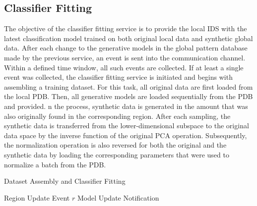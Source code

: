 \documentclass[../../main.tex]{subfiles}
\begin{document}
\subsection{Classifier Fitting} \label{sec:classifier_fitting}

The objective of the classifier fitting service is to provide the local IDS with the latest classification model trained on both original local data and synthetic global data. After each change to the generative models in the global pattern database made by the previous service, an event is sent into the communication channel. Within a defined time window, all such events are collected. If at least a single event was collected, the classifier fitting service is initiated and begins with assembling a training dataset. For this task, all original data are first loaded from the local PDB. Then, all generative models are loaded sequentially from the PDB and provided. n the process, synthetic data is generated in the amount that was also originally found in the corresponding region. After each sampling, the synthetic data is transferred from the lower-dimensional subspace to the original data space by the inverse function of the original PCA operation. Subsequently, the normalization operation is also reversed for both the original and the synthetic data by loading the corresponding parameters that were used to normalize a batch from the PDB. 

\begin{algorithm}
    \caption{Dataset Assembly and Classifier Fitting}
    \label{alg:classifier_fitting}
 
    \begin{algorithmic}[1]
        \REQUIRE Region Update Event $r$
        \ENSURE Model Update Notification

        


    \end{algorithmic}
 \end{algorithm}






\end{document}
